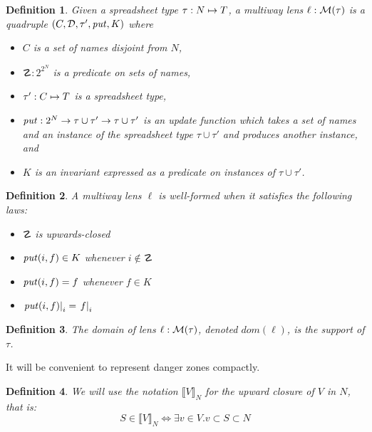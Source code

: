 \documentclass{article}
\newtheorem{definition}{Definition}
\begin{document}
\begin{definition}
    Given a spreadsheet type $\tau : N \mapsto T$,
    a \emph{multiway lens} $\ell : \mathcal M(\tau)$ is a quadruple
    $(C,\mathcal D,\tau',\mathit{put},K)$ where
    \begin{itemize}
        \item $C$ is a set of names disjoint from $N$,
        \item $\danger : 2^{2^N}$ is a predicate on sets of names,
        \item $\tau' : C \mapsto T$ is a spreadsheet type,
        \item $\mathit{put} : 2^N \to \tau \cup \tau' \to \tau \cup \tau'$
            is an update function which takes a set of names and an instance
            of the spreadsheet type $\tau \cup \tau'$ and produces another
            instance, and
        \item $K$ is an invariant expressed as a predicate on instances of
            $\tau \cup \tau'$.
    \end{itemize}
\end{definition}

\begin{definition}
    A multiway lens $\ell$ is \emph{well-formed} when it satisfies the
    following laws:
    \begin{itemize}
        \item $\danger$ is upwards-closed
        \item $\mathit{put}(i,f) \in K$ whenever $i \notin \danger$
        \item $\mathit{put}(i,f) = f$ whenever $f \in K$
        \item $\left.\mathit{put}(i,f)\right|_i = \left.f\right|_i$
    \end{itemize}
\end{definition}

\newcommand{\mdomain}[1]{\mathit{dom}(#1)}
\begin{definition}
    The \emph{domain} of lens $\ell : \mathcal M(\tau)$, denoted $\mdomain\ell$, is
    the support of $\tau$.
\end{definition}

It will be convenient to represent danger zones compactly.

\newcommand{\upclose}[2]{\llbracket #1 \rrbracket_{#2}}
\begin{definition}
    We will use the notation $\upclose VN$ for \emph{the upward closure of
    $V$ in $N$}, that is:
    \[S \in \upclose VN \iff \exists v \in V. v \subset S \subset N\]
\end{definition}
\end{document}
